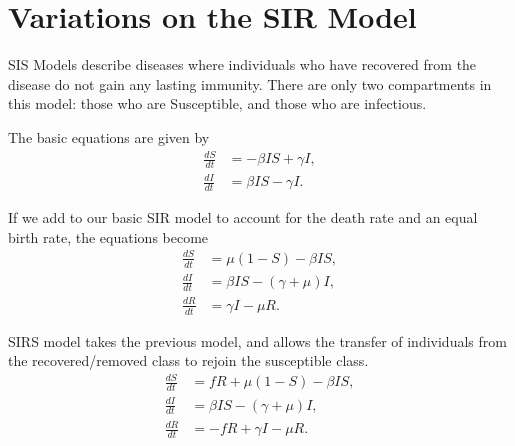 \section*{Variations on the SIR Model}


SIS Models describe diseases where individuals who have recovered from the disease do not gain 
any lasting immunity. There are only two compartments in this model: those who are Susceptible, and 
those who are infectious.

The basic equations are given by 
\begin{align*}
\frac{dS}{dt} &=-\beta I S + \gamma I ,\\
\frac{dI}{dt} &= \beta I S-\gamma I.
\end{align*}


If we add to our basic SIR model to account for the death rate and an equal birth rate, the equations become
\begin{align*}
\frac{dS}{dt} &=\mu(1 -S) - \beta I S,\\
\frac{dI}{dt} &= \beta I S - (\gamma + \mu)I, \\
\frac{dR}{dt} &= \gamma I - \mu R.
\end{align*}

SIRS model takes the previous model, and allows the transfer of individuals from the recovered/removed class to rejoin the susceptible class. 
\begin{align*}
\frac{dS}{dt} &= fR + \mu(1 -S) - \beta I S,\\
\frac{dI}{dt} &= \beta I S - (\gamma + \mu)I, \\
\frac{dR}{dt} &= -fR + \gamma I - \mu R.
\end{align*}


